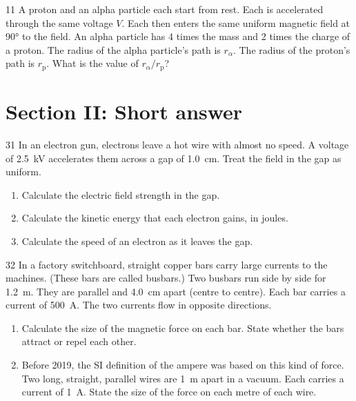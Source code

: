 \begin{practiceq}{1}{1}\label{pq:alpha}
A proton and an alpha particle each start from rest. Each is accelerated through the same
voltage $V$. Each then enters the same uniform magnetic field at \ang{90} to the field. An
alpha particle has 4 times the mass and 2 times the charge of a proton. The radius of the
alpha particle's path is $r_\alpha$. The radius of the proton's path is $r_\mathrm{p}$. What is
the value of $r_\alpha / r_\mathrm{p}$?
\end{practiceq}

\section*{Section II: Short answer}

\begin{practiceq}{3}{1}\label{pq:gun}
In an electron gun, electrons leave a hot wire with almost no speed. A voltage of
\qty{2.5}{kV} accelerates them across a gap of \qty{1.0}{cm}. Treat the field in the gap as
uniform.
\begin{enumerate}[label=(\alph*)]
  \item Calculate the electric field strength in the gap. 
  \item Calculate the kinetic energy that each electron gains, in joules. 
  \item Calculate the speed of an electron as it leaves the gap. 
\end{enumerate}
\end{practiceq}

\begin{practiceq}{3}{2}\label{pq:busbars}
In a factory switchboard, straight copper bars carry large currents to the machines. (These
bars are called busbars.) Two busbars run side by side for \qty{1.2}{m}. They are parallel
and \qty{4.0}{cm} apart (centre to centre). Each bar carries a current of \qty{500}{A}. The
two currents flow in opposite directions.
\begin{enumerate}[label=(\alph*)]
  \item Calculate the size of the magnetic force on each bar. State whether the bars attract
        or repel each other. 
  \item Before 2019, the SI definition of the ampere was based on this kind of force. Two
        long, straight, parallel wires are \qty{1}{m} apart in a vacuum. Each carries a
        current of \qty{1}{A}. State the size of the force on each metre of each wire.
\end{enumerate}
\end{practiceq}


